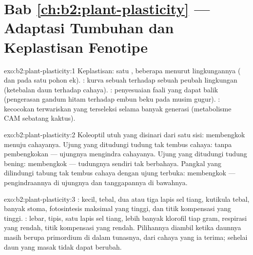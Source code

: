\section*{Bab \ref{ch:b2:plant-plasticity} --- Adaptasi Tumbuhan dan Keplastisan Fenotipe}

\begin{solution}{exo:b2:plant-plasticity:1}
Keplastisan: satu , beberapa  menurut lingkungannya
( dan  pada satu pohon ek). :
kurva  sebuah  terhadap sebuah peubah lingkungan
(ketebalan daun terhadap cahaya). : penyesuaian faali yang
dapat balik (pengerasan gandum hitam terhadap embun beku pada musim
gugur). : kecocokan terwariskan yang terseleksi selama banyak
generasi (metabolisme CAM sebatang kaktus).
\end{solution}

\begin{solution}{exo:b2:plant-plasticity:2}
Koleoptil utuh yang disinari dari satu sisi: membengkok menuju
cahayanya. Ujung yang ditudungi tudung tak tembus cahaya: tanpa
pembengkokan --- ujungnya mengindra cahayanya. Ujung yang ditudungi
tudung bening: membengkok --- tudungnya sendiri tak berbahaya. Pangkal
yang dilindungi tabung tak tembus cahaya dengan ujung terbuka:
membengkok --- pengindraannya di ujungnya dan tanggapannya di bawahnya.
\end{solution}

\begin{solution}{exo:b2:plant-plasticity:3}
: kecil, tebal, dua atau tiga lapis sel tiang, kutikula
tebal, banyak stoma, fotosintesis maksimal yang tinggi, dan titik
kompensasi yang tinggi. : lebar, tipis, satu lapis sel
tiang, lebih banyak klorofil tiap gram, respirasi yang rendah, titik
kompensasi yang rendah. Pilihannya diambil ketika daunnya masih berupa
primordium di dalam tunasnya, dari cahaya yang ia terima; sehelai daun
yang masak tidak dapat berubah.
\end{solution}

